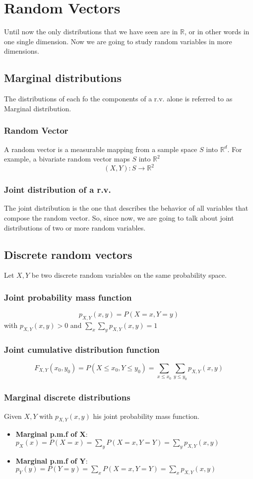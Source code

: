 
\section{Random Vectors}
Until now the only distributions that we have seen are in $\mathbb{R}$, or in
other words in one single dimension. Now we are going to study random variables
in more dimensions.
\subsection{Marginal distributions}
The distributions of each fo the components of a r.v. alone is referred to as
Marginal distribution.


 \subsubsection{Random Vector}
 A random vector is a measurable mapping from a sample space $S$ into
 $\mathbb{R}^d$. For example, a bivariate random vector maps $S$ into
 $\mathbb{R}^2$
 \[ (X,Y):S\rightarrow\mathbb{R}^2 \]

 \subsubsection{Joint distribution of a r.v.}
The joint distribution is the one that describes the behavior of all variables
that compose the random vector. So, since now, we are going to talk about joint
distributions of two or more random variables.

\subsection{Discrete random vectors}
Let $X, Y$ be two discrete random variables on the same probability space.

\subsubsection{Joint probability mass function}
\[ p_{X,Y}(x,y)=P(X=x,Y=y) \] with $p_{X,Y}(x,y)>0$ and
$\sum_x\sum_yp_{X,Y}(x,y)=1$
\subsubsection{Joint cumulative distribution function}
\[ F_{X,Y}(x_0,y_0)=P(X\leq x_0,Y\leq y_0) = \sum_{x\leq x_0}\sum_{y\leq
y_0}p_{X,Y}(x,y) \]
\subsubsection{Marginal discrete distributions}
Given $X, Y$ with $p_{X,Y}(x,y)$ his joint probability mass function.
\begin{itemize}
    \item \textbf{Marginal p.m.f of X}:
    $p_X(x)=P(X=x)=\sum_yP(X=x,Y=Y)=\sum_yp_{X,Y}(x,y)$
    \item \textbf{Marginal p.m.f of Y}:
    $p_Y(y)=P(Y=y)=\sum_xP(X=x,Y=Y)=\sum_xp_{X,Y}(x,y)$
\end{itemize}


